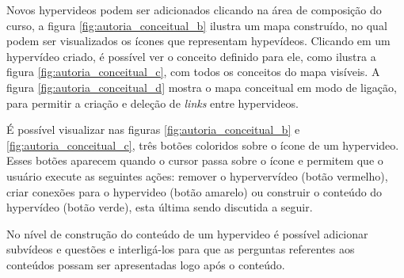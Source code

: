 Novos hypervideos podem ser adicionados clicando na área de composição do curso, a figura \ref{fig:autoria_conceitual_b} ilustra um mapa construído, no qual podem ser visualizados os ícones que representam hypevídeos. Clicando em um hypervídeo criado, é possível ver o conceito definido para ele, como ilustra a figura \ref{fig:autoria_conceitual_c}, com todos os conceitos do mapa visíveis. A figura \ref{fig:autoria_conceitual_d}  mostra o mapa conceitual em modo de ligação, para permitir a criação e deleção de \textit{links} entre hypervideos.

É possível visualizar nas figuras \ref{fig:autoria_conceitual_b} e \ref{fig:autoria_conceitual_c}, três botões coloridos sobre o ícone de um hypervideo. Esses botões aparecem quando o cursor passa sobre o ícone e permitem que o usuário execute as seguintes ações: remover o hypervervídeo (botão vermelho), criar conexões para o hypervideo (botão amarelo) ou construir o conteúdo do hypervídeo (botão verde), esta última sendo discutida a seguir. 

No nível de construção do conteúdo de um hypervideo é possível adicionar subvídeos e questões e interligá-los para que as perguntas referentes aos conteúdos possam ser apresentadas logo após o conteúdo. 

